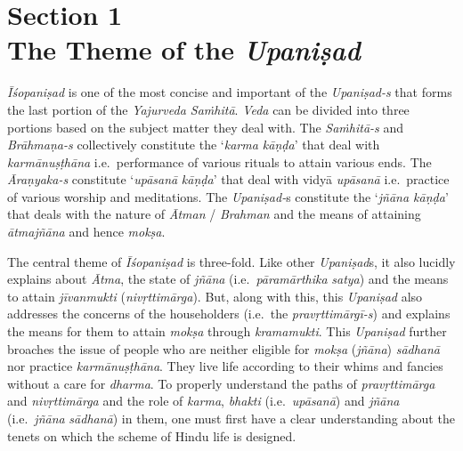 \chapter[Section 1 The Theme of the \emph{Upaniṣad}]{Section 1\\ The Theme of the \emph{Upaniṣad}}

\emph{Īśopaniṣad} is one of the most concise and important of the \emph{Upaniṣad-s} that forms the last portion of the \emph{Yajurveda Saṁhitā}. \emph{Veda} can be divided into three portions based on the subject matter they deal with. The \emph{Saṁhitā-s} and \emph{Brāhmaṇa-s} collectively constitute the `\emph{karma kāṇḍa}' that deal with \emph{karmānuṣṭhāna} i.e.\ performance of various rituals to attain various ends. The \emph{Āraṇyaka-s} constitute `\emph{upāsanā} \emph{kāṇḍa}' that deal with vidyā \emph{upāsanā} i.e.\ practice of various worship and meditations. The \emph{Upaniṣad-}s constitute the `\emph{jñāna kāṇḍa}' that deals with the nature of \emph{Ātman} / \emph{Brahman} and the means of attaining \emph{ātmajñāna} and hence \emph{mokṣa}.
\vskip 2pt

The central theme of \emph{Īśopaniṣad} is three-fold. Like other \emph{Upaniṣad}s, it also lucidly explains about \emph{Ātma}, the state of \emph{jñāna} (i.e.\ \emph{pāramārthika} \emph{satya}) and the means to attain \emph{jīvanmukti} (\emph{nivṛttimārga}). But, along with this, this \emph{Upaniṣad} also addresses the concerns of the householders (i.e.\ the \emph{pravṛttimārgī-s}) and explains the means for them to attain \emph{mokṣa} through \emph{kramamukti}. This \emph{Upaniṣad} further broaches the issue of people who are neither eligible for \emph{mokṣa} (\emph{jñāna}) \emph{sādhanā} nor practice \emph{karmānuṣṭhāna}. They live life according to their whims and fancies without a care for \emph{dharma}. To properly understand the paths of \emph{pravṛttimārga} and \emph{nivṛttimārga} and the role of \emph{karma}, \emph{bhakti} (i.e.\ \emph{upāsanā}) and \emph{jñāna} (i.e.\ \emph{jñāna} \emph{sādhanā}) in them, one must first have a clear understanding about the tenets on which the scheme of Hindu life is designed.
\vskip 2.3pt

